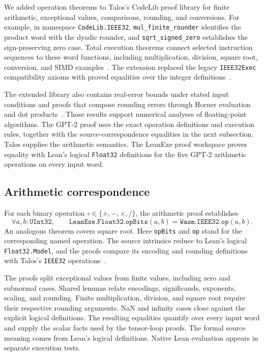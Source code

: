 \documentclass[11pt]{article}
\newcommand{\code}[1]{\texttt{#1}}
\begin{document}
We added operation theorems to Talos's CodeLib proof library for finite arithmetic, exceptional values, comparisons, rounding, and conversions.  For example, in namespace \code{CodeLib.IEEE32}, \code{mul\_finite\_rounder} identifies the product word with the dyadic rounder, and \code{sqrt\_signed\_zero} establishes the sign-preserving zero case.  Total execution theorems connect selected instruction sequences to these word functions, including multiplication, division, square root, conversion, and SIMD examples~\cite{talosfpproofs}.  The extension replaced the legacy \code{IEEE32Exec} compatibility axioms with proved equalities over the integer definitions~\cite{taloscompat}.

The extended library also contains real-error bounds under stated input conditions and proofs that compose rounding errors through Horner evaluation and dot products~\cite{talosnumeric}.  Those results support numerical analyses of floating-point algorithms.  The GPT-2 proof uses the exact operation definitions and execution rules, together with the source-correspondence equalities in the next subsection.  Talos supplies the arithmetic semantics.  The LeanExe proof workspace proves equality with Lean's logical \code{Float32} definitions for the five GPT-2 arithmetic operations on every input word.

\subsection{Arithmetic correspondence}

For each binary operation $\circ\in\{+,-,\times,/\}$, the arithmetic proof establishes
\[
\forall a,b:\code{UInt32},\qquad
\code{LeanExe.Float32.opBits}(a,b)
=\code{Wasm.IEEE32.op}(a,b).
\]
An analogous theorem covers square root.  Here \code{opBits} and \code{op} stand for the corresponding named operation.  The source intrinsics reduce to Lean's logical \code{Float32.Model}, and the proofs compare its encoding and rounding definitions with Talos's \code{IEEE32} operations~\cite{f32,leanfloat}.

The proofs split exceptional values from finite values, including zero and subnormal cases.  Shared lemmas relate encodings, significands, exponents, scaling, and rounding.  Finite multiplication, division, and square root require their respective rounding arguments.  NaN and infinity cases close against the explicit logical definitions.  The resulting equalities quantify over every input word and supply the scalar facts used by the tensor-loop proofs.  The formal source meaning comes from Lean's logical definitions.  Native Lean evaluation appears in separate execution tests.
\end{document}
